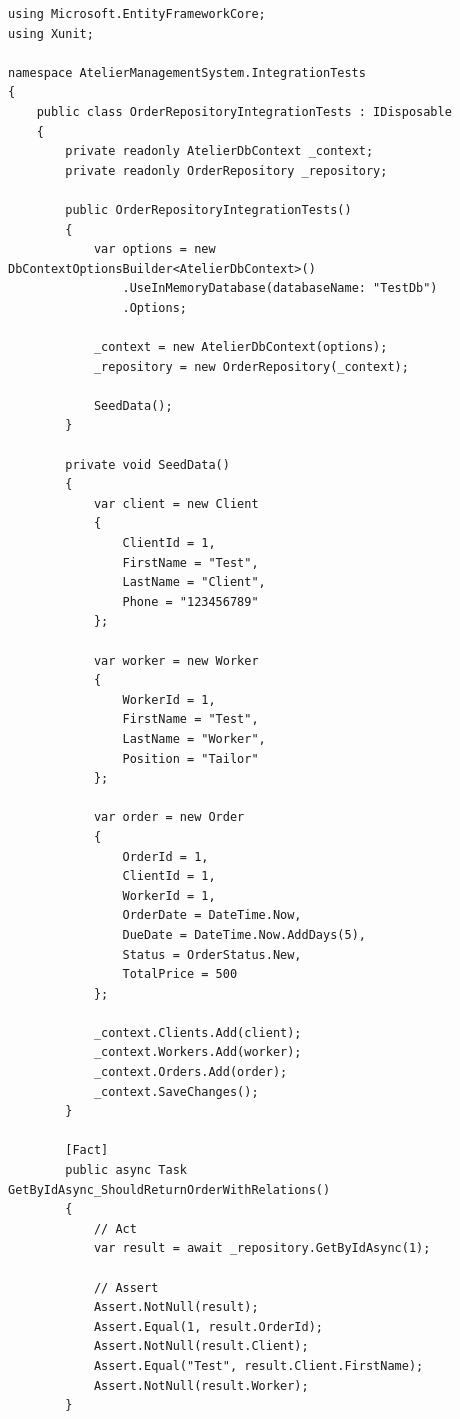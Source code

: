 \documentclass[14pt,a4paper]{extarticle}
\begin{document}
\begin{lstlisting}[language={[Sharp]C}, caption=Інтеграційні тести з базою даних, basicstyle=\small\ttfamily, breaklines=true, frame=single]
using Microsoft.EntityFrameworkCore;
using Xunit;

namespace AtelierManagementSystem.IntegrationTests
{
    public class OrderRepositoryIntegrationTests : IDisposable
    {
        private readonly AtelierDbContext _context;
        private readonly OrderRepository _repository;
        
        public OrderRepositoryIntegrationTests()
        {
            var options = new DbContextOptionsBuilder<AtelierDbContext>()
                .UseInMemoryDatabase(databaseName: "TestDb")
                .Options;
                
            _context = new AtelierDbContext(options);
            _repository = new OrderRepository(_context);
            
            SeedData();
        }
        
        private void SeedData()
        {
            var client = new Client
            {
                ClientId = 1,
                FirstName = "Test",
                LastName = "Client",
                Phone = "123456789"
            };
            
            var worker = new Worker
            {
                WorkerId = 1,
                FirstName = "Test",
                LastName = "Worker",
                Position = "Tailor"
            };
            
            var order = new Order
            {
                OrderId = 1,
                ClientId = 1,
                WorkerId = 1,
                OrderDate = DateTime.Now,
                DueDate = DateTime.Now.AddDays(5),
                Status = OrderStatus.New,
                TotalPrice = 500
            };
            
            _context.Clients.Add(client);
            _context.Workers.Add(worker);
            _context.Orders.Add(order);
            _context.SaveChanges();
        }
        
        [Fact]
        public async Task GetByIdAsync_ShouldReturnOrderWithRelations()
        {
            // Act
            var result = await _repository.GetByIdAsync(1);
            
            // Assert
            Assert.NotNull(result);
            Assert.Equal(1, result.OrderId);
            Assert.NotNull(result.Client);
            Assert.Equal("Test", result.Client.FirstName);
            Assert.NotNull(result.Worker);
        }
        

\end{lstlisting}
\end{document}
